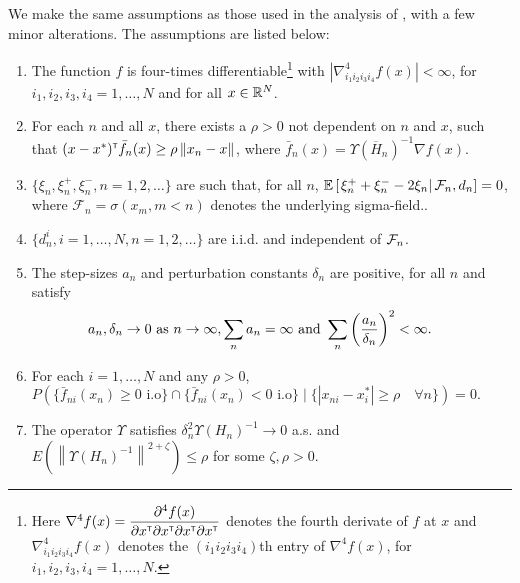 We make the same assumptions as those used in the analysis of \cite{prashanth2015rdsa}, with a few minor alterations. The assumptions are listed below:
\begin{enumerate}[label=(\textbf{C\arabic*})]
\item  The function
$f$ is four-times differentiable\footnote{Here $\nabla^4 f(x) = \dfrac{\partial^4 f (x)}{\partial x^\mathsf{\scriptscriptstyle T} \partial x^\mathsf{\scriptscriptstyle T} \partial x^\mathsf{\scriptscriptstyle T} \partial x^\mathsf{\scriptscriptstyle T}}$ denotes the fourth derivate of $f$ at $x$ and $\nabla^4_{i_1 i_2 i_3 i_4} f(x)$ denotes the $(i_1 i_2 i_3 i_4)$th entry of $\nabla^4 f(x)$, for $i_1, i_2, i_3,i_4=1,\ldots, N$.} with $\left|\nabla^4_{i_1 i_2 i_3 i_4} f(x) \right| < \infty$, for $i_1, i_2, i_3,i_4=1,\ldots, N$ and for all $x\in \mathbb{R}^N$. 


\item For each $n$ and all $x$, there exists a $\rho>0$ not dependent on $n$ and $x$, such that $(x-x^*)^\mathsf{\scriptscriptstyle T} \bar f_n(x) \ge \rho \left\| x_n - x\right\|$, where $\bar f_n(x) = \Upsilon(\overline H_n)^{-1} \nabla f(x)$.

\item $\{\xi_n, \xi_n^+,\xi_n^-, n=1,2,\ldots\}$ are such that, for all $n$, $\mathbb{E}\left[\left. \xi_n^+ + \xi_n^- - 2 \xi_n \right| \mathcal{F}_n, d_n\right] = 0$, where $\mathcal{F}_n = \sigma(x_m,m < n)$ denotes the underlying sigma-field.. 

\item $\{d_n^i, i=1,\ldots,N, n=1,2,\ldots\}$ are i.i.d. and independent of $\mathcal{F}_n$.

\item  The step-sizes $a_n$ and perturbation constants $\delta_n$ are positive, for all $n$ and satisfy
$$\hspace{-1.7em} a_n, \delta_n \rightarrow 0\text{ as } n \rightarrow \infty, 
\sum_n a_n=\infty \text{ and } \sum_n \left(\frac{a_n}{\delta_n}\right)^2 <\infty.$$

\item For each $i=1,\ldots,N$ and any $\rho>0$, 
$P(\{ \bar f_{ni} (x_n) \ge 0 \text{ i.o}\} \cap \{ \bar f_{ni} (x_n) < 0 \text{ i.o}\} \mid \{ |x_{ni} - x^*_i| \ge \rho\quad \forall n\}) =0.$

\item The operator $\Upsilon$ satisfies $\delta_n^2 \Upsilon(H_n)^{-1} \rightarrow 0$ a.s. and  $E(\left\| \Upsilon(H_n)^{-1}\right\|^{2+\zeta}) \le \rho$ for some $\zeta, \rho>0$.


\end{enumerate}
